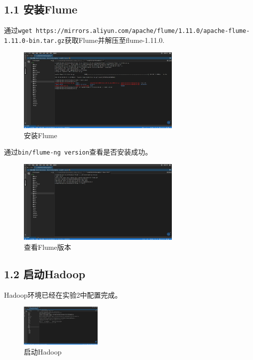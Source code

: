 \documentclass{article}
\begin{document}
\subsection*{1.1 安装Flume}
通过\lstinline[style=Style]|wget https://mirrors.aliyun.com/apache/flume/1.11.0/apache-flume-1.11.0-bin.tar.gz|获取Flume并解压至flume-1.11.0.
\begin{figure}[H]
    \centering
    \includegraphics[width=0.7\textwidth]{./pic/12.png}
    \caption{安装Flume}
\end{figure}
通过\lstinline[style=Style]|bin/flume-ng version|查看是否安装成功。
\begin{figure}[H]
    \centering
    \includegraphics[width=0.7\textwidth]{./pic/13.png}
    \caption{查看Flume版本}
\end{figure}
\subsection*{1.2 启动Hadoop}
Hadoop环境已经在实验2中配置完成。
\begin{figure}[H]
    \centering
    \includegraphics[width=0.35\textwidth]{./pic/10.png}
    \caption{启动Hadoop}
\end{figure}
\end{document}
